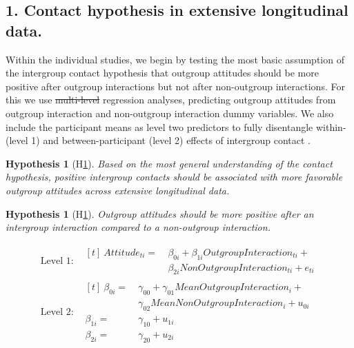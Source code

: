\documentclass[man, 12pt, a4paper, mask]{apa7}
\theoremstyle{break}
\theoremstyle{plain}
\newtheorem{hyp}{Hypothesis}
\newtheorem{subhyp}{Hypothesis}
\providecommand{\DIFaddtex}[1]{{\protect\color{blue}\uwave{#1}}} %
\providecommand{\DIFdeltex}[1]{{\protect\color{red}\sout{#1}}}                      %
\providecommand{\DIFaddbegin}{} %
\providecommand{\DIFaddend}{} %
\providecommand{\DIFdelbegin}{} %
\providecommand{\DIFdelend}{} %
\providecommand{\DIFadd}[1]{\texorpdfstring{\DIFaddtex{#1}}{#1}} %
\providecommand{\DIFdel}[1]{\texorpdfstring{\DIFdeltex{#1}}{}} %
\newcommand{\DIFscaledelfig}{0.5}
\newlength{\DIFdelgraphicswidth} %
\newlength{\DIFdelgraphicsheight} %
\newcommand{\DIFaddincludegraphics}[2][]{{\color{blue}\fbox{\DIFOincludegraphics[#1]{#2}}}} %
\newcommand{\DIFdelincludegraphics}[2][]{%
\sbox{\DIFdelgraphicsbox}{\DIFOincludegraphics[#1]{#2}}%
\settoboxwidth{\DIFdelgraphicswidth}{\DIFdelgraphicsbox} %
\settoboxtotalheight{\DIFdelgraphicsheight}{\DIFdelgraphicsbox} %
\scalebox{\DIFscaledelfig}{%
\parbox[b]{\DIFdelgraphicswidth}{\usebox{\DIFdelgraphicsbox}\\[-\baselineskip] \rule{\DIFdelgraphicswidth}{0em}}\llap{\resizebox{\DIFdelgraphicswidth}{\DIFdelgraphicsheight}{%
\setlength{\unitlength}{\DIFdelgraphicswidth}%
\begin{picture}(1,1)%
\thicklines\linethickness{2pt} %
{\color[rgb]{1,0,0}\put(0,0){\framebox(1,1){}}}%
{\color[rgb]{1,0,0}\put(0,0){\line( 1,1){1}}}%
{\color[rgb]{1,0,0}\put(0,1){\line(1,-1){1}}}%
\end{picture}%
}\hspace*{3pt}}} %
} %
\DeclareRobustCommand{\DIFaddbegin}{\DIFOaddbegin \let\includegraphics\DIFaddincludegraphics} %
\DeclareRobustCommand{\DIFaddend}{\DIFOaddend \let\includegraphics\DIFOincludegraphics} %
\DeclareRobustCommand{\DIFdelbegin}{\DIFOdelbegin \let\includegraphics\DIFdelincludegraphics} %
\DeclareRobustCommand{\DIFdelend}{\DIFOaddend \let\includegraphics\DIFOincludegraphics} %
\begin{document}
\subsection{1. Contact hypothesis in extensive longitudinal data.} 
Within the individual studies, we begin by testing the most basic assumption of the intergroup contact hypothesis that outgroup attitudes should be more positive after outgroup interactions but not after non-outgroup interactions. For this we use \DIFdelbegin \DIFdel{multi-level }\DIFdelend \DIFaddbegin \DIFadd{multilevel }\DIFaddend regression analyses, predicting outgroup attitudes from outgroup interaction and non-outgroup interaction dummy variables. We also include the participant means as level two predictors to fully disentangle within- (level 1) and between-participant (level 2) effects of intergroup contact \DIFdelbegin %
\DIFdelend \DIFaddbegin \citep[e.g.,][Section 4.6]{snijders2012}\DIFaddend .

\begin{mdframed}[style=mdfhypothesis]
    \begin{hyp}[H\ref{hyp:contactHyp}] \label{hyp:contactHyp}
        Based on the most general understanding of the contact hypothesis, positive intergroup contacts should be associated with more favorable outgroup attitudes across extensive longitudinal data.
    \end{hyp}

    \begin{subhyp}[H\ref{hyp:contactDummyML}] \label{hyp:contactDummyML}
    \addtolength{\leftskip}{\subhypskip}
    Outgroup attitudes should be more positive after an intergroup interaction compared to a non-outgroup interaction.
    \end{subhyp}

    \begin{fleqn}[\eqskip] 
    \begin{equation} \label{eq:ContactDummy}
      \begin{split}
        \textrm{Level 1:} &
          \begin{aligned}[t]
            \ Attitude_{ti} =  &\ \beta_{0i} + \beta_{1i}OutgroupInteraction_{ti} + \\
                               &\ \beta_{2i}NonOutgroupInteraction_{ti} + e_{ti}
          \end{aligned} \\
        \textrm{Level 2:} &
            \begin{aligned}[t]
                \ \beta_{0i} = &\ \gamma_{00} + \gamma_{01}MeanOutgroupInteraction_{i} + \\
                               &\ \gamma_{02}MeanNonOutgroupInteraction_{i} + u_{0i} \\
                  \beta_{1i} = &\ \gamma_{10} + u_{1i} \\
                  \beta_{2i} = &\ \gamma_{20} + u_{2i}
            \end{aligned}
      \end{split} 
    \end{equation}
    \end{fleqn}
\end{mdframed}
\end{document}
